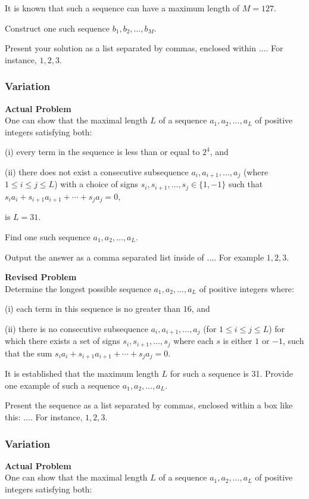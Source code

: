 It is known that such a sequence can have a maximum length of \( M = 127 \).

Construct one such sequence \( b_1, b_2, \ldots, b_M \).

Present your solution as a list separated by commas, enclosed within $\boxed{...}$. For instance, $\boxed{1, 2, 3}$.

\subsubsection{Variation}
\textbf{Actual Problem}\\
One can show that the maximal length $L$ of a sequence $a_1, a_2, \ldots, a_L$ of positive integers satisfying both:

(i) every term in the sequence is less than or equal to $2^4$, and

(ii) there does not exist a consecutive subsequence $a_i, a_{i+1}, \ldots, a_{j}$ (where $1 \leq i \leq j \leq L$) with
a choice of signs $s_i, s_{i+1}, \ldots, s_{j} \in \{1, -1\}$ such that $s_i a_i + s_{i+1} a_{i+1} + \cdots + s_{j} a_{j} = 0$,

is $L = 31$.

Find one such sequence $a_1, a_2, \ldots, a_L$.

Output the answer as a comma separated list inside of $\boxed{...}$. For example $\boxed{1, 2, 3}$.

\textbf{Revised Problem}\\
Determine the longest possible sequence \( a_1, a_2, \ldots, a_L \) of positive integers where:

(i) each term in this sequence is no greater than \( 16 \), and

(ii) there is no consecutive subsequence \( a_i, a_{i+1}, \ldots, a_j \) (for \( 1 \leq i \leq j \leq L \)) for which there exists a set of signs \( s_i, s_{i+1}, \ldots, s_j \) where each \( s \) is either \( 1 \) or \( -1 \), such that the sum \( s_i a_i + s_{i+1} a_{i+1} + \cdots + s_j a_j = 0 \).

It is established that the maximum length \( L \) for such a sequence is 31. Provide one example of such a sequence \( a_1, a_2, \ldots, a_L \).

Present the sequence as a list separated by commas, enclosed within a box like this: \(\boxed{...}\). For instance, \(\boxed{1, 2, 3}\).

\subsubsection{Variation}
\textbf{Actual Problem}\\
One can show that the maximal length $L$ of a sequence $a_1, a_2, \ldots, a_L$ of positive integers satisfying both:

